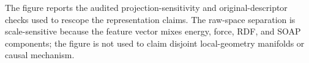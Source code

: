 The figure reports the audited projection-sensitivity and original-descriptor checks used to rescope the representation claims. The raw-space separation is scale-sensitive because the feature vector mixes energy, force, RDF, and SOAP components; the figure is not used to claim disjoint local-geometry manifolds or causal mechanism.

